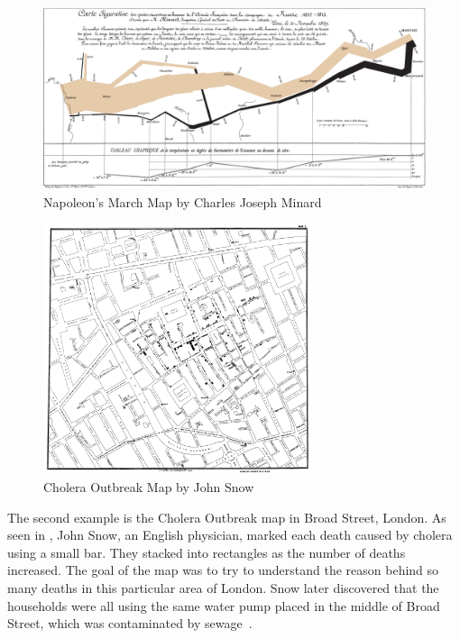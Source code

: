 \clearpage

\begin{figure}[h]
    \begin{center}
        \includegraphics[width=\textwidth]{graphics/2-literature-review/2}
    \end{center}
    \caption{Napoleon’s March Map by Charles Joseph Minard~\citep{corbett2001charles}}
    \label{fig:figure2.2}
\end{figure}

\begin{figure}[hbt!]
    \begin{center}
        \includegraphics[width=0.7\textwidth]{graphics/2-literature-review/3}
    \end{center}
    \caption{Cholera Outbreak Map by John Snow~\citep{snow1855mode}}
    \label{fig:figure2.3}
\end{figure}

\clearpage

The second example is the Cholera Outbreak map in Broad Street, London. As seen in ,
John Snow, an English physician, marked each death caused by cholera using a small bar. They stacked into rectangles as the number of deaths
increased. The goal of the map was to try to understand the reason behind so many deaths in this particular area
of London. Snow later discovered that the households were all using the same water pump placed in the middle of
Broad Street, which was contaminated by sewage~\citep{snow1855mode}.

